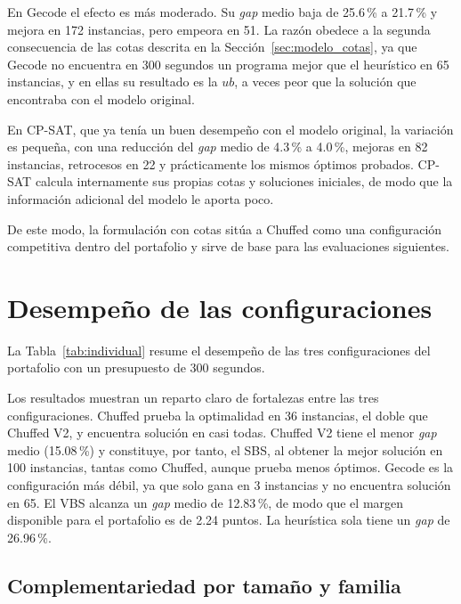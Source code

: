 En Gecode el efecto es más moderado. Su \textit{gap} medio baja de 25.6\,\% a
21.7\,\% y mejora en 172 instancias, pero empeora en 51. La razón obedece a la
segunda consecuencia de las cotas descrita en la
Sección~\ref{sec:modelo_cotas}, ya que Gecode no encuentra en 300 segundos un
programa mejor que el heurístico en 65 instancias, y en ellas su resultado es
la $ub$, a veces peor que la solución que encontraba con el modelo original.

En CP-SAT, que ya tenía un buen desempeño con el modelo original, la variación
es pequeña, con una reducción del \textit{gap} medio de 4.3\,\% a 4.0\,\%,
mejoras en 82 instancias, retrocesos en 22 y prácticamente los mismos óptimos
probados. CP-SAT calcula internamente sus propias cotas y soluciones iniciales,
de modo que la información adicional del modelo le aporta poco.

De este modo, la formulación con cotas sitúa a Chuffed como una configuración
competitiva dentro del portafolio y sirve de base para las evaluaciones
siguientes.

\section{Desempeño de las configuraciones}
\label{sec:res_solvers}

La Tabla~\ref{tab:individual} resume el desempeño de las tres configuraciones
del portafolio con un presupuesto de 300 segundos.



Los resultados muestran un reparto claro de fortalezas entre las tres
configuraciones. Chuffed prueba la optimalidad en 36 instancias, el doble que
Chuffed V2, y encuentra solución en casi todas. Chuffed V2 tiene el menor
\textit{gap} medio (15.08\,\%) y constituye, por tanto, el SBS, al obtener la
mejor solución en 100 instancias, tantas como Chuffed, aunque prueba menos
óptimos. Gecode es la configuración más débil, ya que solo gana en 3 instancias
y no encuentra solución en 65. El VBS alcanza un \textit{gap} medio de
12.83\,\%, de modo que el margen disponible para el portafolio es de 2.24
puntos. La heurística sola tiene un \textit{gap} de 26.96\,\%.

\subsection{Complementariedad por tamaño y familia}

